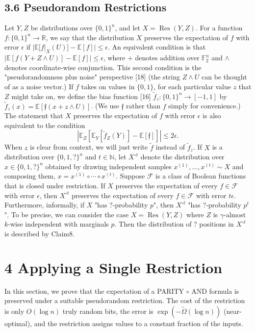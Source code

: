 \documentclass[10pt,a4paper]{article}
\begin{document}
\subsection*{3.6 Pseudorandom Restrictions}
Let $Y,Z$ be distributions over $\{0,1\}^n$, and let $X=\operatorname{Res}(Y,Z)$. For a function $f:\{0,1\}^n\to\mathbb R$, we say that the distribution $X$ preserves the expectation of $f$ with error $\epsilon$ if $|\mathbb E[f|_X(U)]-\mathbb E[f]|\le\epsilon$.
An equivalent condition is that $|\mathbb E[f(Y+Z\wedge U)]-\mathbb E[f]|\le\epsilon$, where $+$ denotes addition over $\mathbb F_2^n$ and $\wedge$ denotes coordinate-wise conjunction. This second condition is the "pseudorandomness plus noise" perspective [18] (the string $Z\wedge U$ can be thought of as a noise vector.)
If $f$ takes on values in $\{0,1\}$, for each particular value $z$ that $Z$ might take on, we define the bias function [16] $\widetilde f_z:\{0,1\}^n\to[-1,1]$ by $\widetilde f_z(x)=\mathbb E[\mathfrak f(x+z\wedge U)]$. (We use $\mathfrak f$ rather than $f$ simply for convenience.) The statement that $X$ preserves the expectation of $f$ with error $\epsilon$ is also equivalent to the condition
\[
\left|\mathbb E_Z[\mathbb E_Y[\widetilde f_Z(Y)]-\mathbb E[\mathfrak f]]\right|\le2\epsilon.
\]
When $z$ is clear from context, we will just write $\widetilde f$ instead of $\widetilde f_z$.
If $X$ is a distribution over $\{0,1,?\}^n$ and $t\in\mathbb N$, let $X^{\circ t}$ denote the distribution over $x\in\{0,1,?\}^n$ obtained by drawing independent samples $x^{(1)},\ldots,x^{(t)}\sim X$ and composing them, $x=x^{(1)}\circ\cdots\circ x^{(t)}$.
Suppose $\mathcal F$ is a class of Boolean functions that is closed under restriction. If $X$ preserves the expectation of every $f\in\mathcal F$ with error $\epsilon$, then $X^{\circ t}$ preserves the expectation of every $f\in\mathcal F$ with error $t\epsilon$. Furthermore, informally, if $X$ "has ?-probability $p$", then $X^{\circ t}$ "has ?-probability $p^t$". To be precise, we can consider the case $X=\operatorname{Res}(Y,Z)$ where $Z$ is $\gamma$-almost $k$-wise independent with marginals $p$. Then the distribution of ? positions in $X^{\circ t}$ is described by Claim8.

\section*{4 Applying a Single Restriction}
In this section, we prove that the expectation of a PARITY $\circ$ AND formula is preserved under a suitable pseudorandom restriction. The cost of the restriction is only $O(\log n)$ truly random bits, the error is $\exp(-\widetilde\Omega(\log n))$ (near-optimal), and the restriction assigns values to a constant fraction of the inputs.
\end{document}
